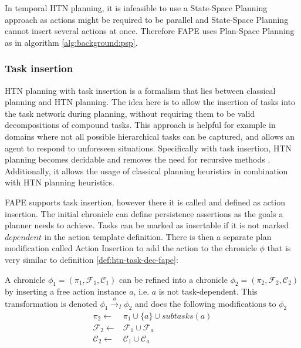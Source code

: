 In temporal HTN planning, it is infeasible to use a State-Space Planning approach as actions might be required to be parallel and State-Space Planning cannot insert several actions at once.
Therefore FAPE uses Plan-Space Planning as in algorithm \ref{alg:background:psp}.

\subsubsection{Task insertion}

HTN planning with task insertion \citep{geierDecidabilityHTNPlanning2011} is a formalism that lies between classical planning and HTN planning.
The idea here is to allow the insertion of tasks into the task network during planning, without requiring them to be valid decompositions of compound tasks.
This approach is helpful for example in domains where not all possible hierarchical tasks can be captured, and allows an agent to respond to unforeseen situations.
Specifically with task insertion, HTN planning becomes decidable \citep{geierDecidabilityHTNPlanning2011} and removes the need for recursive methods \citep{bercherSurveyHierarchicalPlanning2019}. 
Additionally, it allows the usage of classical planning heuristics in combination with HTN planning heuristics.

FAPE supports task insertion, however there it is called and defined as action insertion.
The initial chronicle can define persistence assertions as the goals a planner needs to achieve.
Tasks can be marked as insertable if it is not marked $dependent$ in the action template definition.
There is then a separate plan modification called Action Insertion to add the action to the chronicle $\phi$ that is very similar to definition \ref{def:htn-task-dec-fape}:

\begin{definition}
  A chronicle $\phi_1 = (\pi_1,\mathcal{F}_1,\mathcal{C}_1)$ can be refined into a chronicle $\phi_2 = (\pi_2,\mathcal{F}_2,\mathcal{C}_2)$ by inserting a free action instance $a$, i.e. $a$ is not task-dependent. This transformation is denoted $\phi_1 \xrightarrow{a}_I \phi_2$ and does the following modifications to $\phi_2$
  \begin{align*}
    \pi_2 \leftarrow & \pi_1 \cup \{a\} \cup subtasks(a) \\
    \mathcal{F}_2 \leftarrow & \mathcal{F}_1 \cup \mathcal{F}_a \\
    \mathcal{C}_2 \leftarrow & \mathcal{C}_1 \cup \mathcal{C}_a \\
  \end{align*}
\end{definition}


